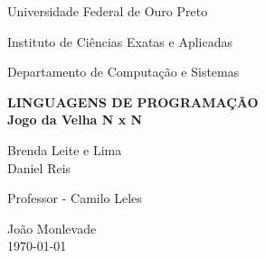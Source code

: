 \documentclass[brazil, a4paper,12pt]{article}
\begin{document}
\begin{titlepage}

  \vfill

  \begin{center}
    \begin{large}
      Universidade Federal de Ouro Preto
    \end{large}
  \end{center}

  \begin{center}
    \begin{large}
      Instituto de Ciências Exatas e Aplicadas
    \end{large}
  \end{center}

  \begin{center}
    \begin{large}
      Departamento de Computação e Sistemas
    \end{large}
  \end{center}

  \vfill

  \begin{center}
    \begin{Large}
      \textbf{LINGUAGENS DE PROGRAMAÇÃO\\[0.4cm] 
        Jogo da Velha N x N}               
    \end{Large}
  \end{center}


  \vfill

  \begin{center}
    \begin{large}
      Brenda Leite e Lima\\
      Daniel Reis
    \end{large}
  \end{center}

  \begin{center}
    \begin{large}
      Professor - Camilo Leles
    \end{large}
  \end{center}

  \vfill

  \begin{center}
    \begin{large}
      João Monlevade \\
      \today \\
    \end{large}
  \end{center}

\clearpage
\tableofcontents 
\end{titlepage}
\end{document}
